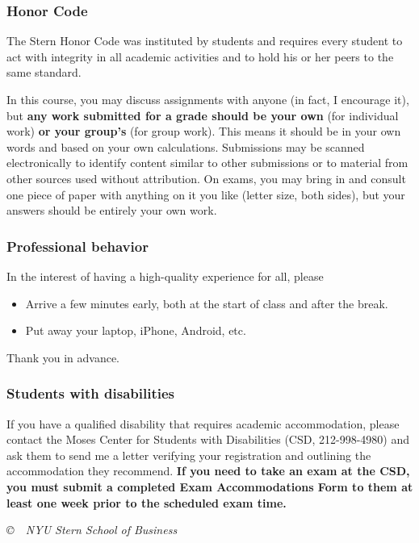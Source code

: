 \documentclass[12pt]{article}
\begin{document}
\subsubsection*{Honor Code}

The Stern Honor Code was instituted by students
and requires every student to act with integrity in all
academic activities and to hold his or her peers to the same
standard.

In this course, you may discuss assignments with anyone
(in fact, I encourage it), but {\bf any work submitted for a
grade should be your own} (for individual work) {\bf or your group's}
(for group work).
This means it should be in your own words and based on your own calculations.
Submissions may be scanned electronically to identify
content similar to other submissions or to material from other sources
used without attribution.
On exams, you may bring in and consult one piece
of paper with anything on it you like (letter size, both sides),
but your answers should be entirely your own work.


\subsubsection*{Professional behavior}

In the interest of having a high-quality experience for all,
please
%
\begin{itemize}
\item Arrive a few minutes early,
both at the start of class and after the break.

\item Put away your laptop, iPhone, Android, etc.

%
\end{itemize}
Thank you in advance.


\subsubsection*{Students with disabilities}

If you have a qualified disability that requires academic accommodation,
please contact the Moses Center for Students with Disabilities (CSD, 212-998-4980) and ask them to
send me a letter verifying your registration and outlining the accommodation they recommend.
{\bf If you need to take an exam at the CSD,
you must submit a completed Exam Accommodations Form to them
at least one week prior to the scheduled exam time.}

\vfill
\centerline{\it \copyright \ \number\year \ NYU Stern School of Business}
\end{document}
